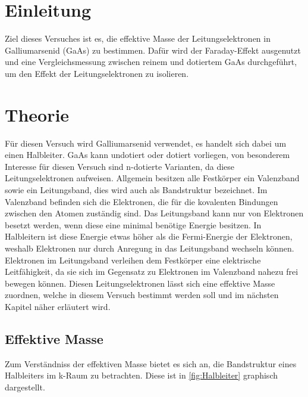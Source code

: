 \section{Einleitung}
\label{sec:Einleitung}

Ziel dieses Versuches ist es, die effektive Masse der Leitungselektronen in Galliumarsenid (GaAs) zu bestimmen.
Dafür wird der Faraday-Effekt ausgenutzt und eine Vergleichsmessung zwischen reinem und dotiertem GaAs durchgeführt,
um den Effekt der Leitungselektronen zu isolieren.

\section{Theorie}
\label{sec:Theorie}

Für diesen Versuch wird Galliumarsenid verwendet, es handelt sich dabei um einen Halbleiter.
GaAs kann undotiert oder dotiert vorliegen, von besonderem Interesse für diesen Versuch sind n-dotierte
Varianten, da diese Leitungselektronen aufweisen.
Allgemein besitzen alle Festkörper ein Valenzband sowie ein Leitungsband, dies wird auch als Bandstruktur bezeichnet. Im Valenzband befinden sich
die Elektronen, die für die kovalenten Bindungen zwischen den Atomen zuständig sind.
Das Leitungsband kann nur von Elektronen besetzt werden, wenn diese eine minimal benötige Energie besitzen.
In Halbleitern ist diese Energie etwas höher als die Fermi-Energie der Elektronen, weshalb Elektronen
nur durch Anregung in das Leitungsband wechseln können.
Elektronen im Leitungsband verleihen dem Festkörper eine elektrische Leitfähigkeit, da sie sich
im Gegensatz zu Elektronen im Valenzband nahezu frei bewegen können.
Diesen Leitungselektronen lässt sich
eine effektive Masse zuordnen, welche in diesem Versuch bestimmt werden soll und im nächsten Kapitel
näher erläutert wird.

\subsection{Effektive Masse}

Zum Verständniss der effektiven Masse bietet es sich an, die Bandstruktur eines Halbleiters im k-Raum
zu betrachten. Diese ist in \autoref{fig:Halbleiter} graphisch dargestellt.

